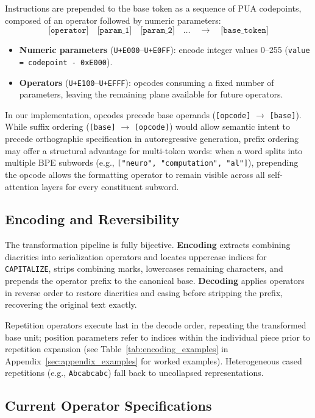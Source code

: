 \documentclass{article}
\begin{document}
Instructions are prepended to the base token as a sequence of PUA codepoints, composed of an operator followed by numeric parameters:
\[
    \texttt{[operator]} \quad \texttt{[param\_1]} \quad \texttt{[param\_2]} \quad \dots \quad \to \quad \texttt{[base\_token]}
\]
\begin{itemize}
    \item \textbf{Numeric parameters} (\texttt{U+E000}--\texttt{U+E0FF}): encode integer values 0--255 (\texttt{value = codepoint - 0xE000}).
    \item \textbf{Operators} (\texttt{U+E100}--\texttt{U+EFFF}): opcodes consuming a fixed number of parameters, leaving the remaining plane available for future operators.
\end{itemize}
In our implementation, opcodes precede base operands (\texttt{[opcode]} $\to$ \texttt{[base]}). While suffix ordering (\texttt{[base]} $\to$ \texttt{[opcode]}) would allow semantic intent to precede orthographic specification in autoregressive generation, prefix ordering may offer a structural advantage for multi-token words: when a word splits into multiple BPE subwords (e.g., \texttt{["neuro", "computation", "al"]}), prepending the opcode allows the formatting operator to remain visible across all self-attention layers for every constituent subword.

\subsection{Encoding and Reversibility}

The transformation pipeline is fully bijective. \textbf{Encoding} extracts combining diacritics into serialization operators and locates uppercase indices for \texttt{CAPITALIZE}, strips combining marks, lowercases remaining characters, and prepends the operator prefix to the canonical base. \textbf{Decoding} applies operators in reverse order to restore diacritics and casing before stripping the prefix, recovering the original text exactly.

Repetition operators execute last in the decode order, repeating the transformed base unit; position parameters refer to indices within the individual piece prior to repetition expansion (see Table~\ref{tab:encoding_examples} in Appendix~\ref{sec:appendix_examples} for worked examples). Heterogeneous cased repetitions (e.g., \texttt{Abcabcabc}) fall back to uncollapsed representations.

\subsection{Current Operator Specifications}
\label{sec:framework_operators}
\end{document}

